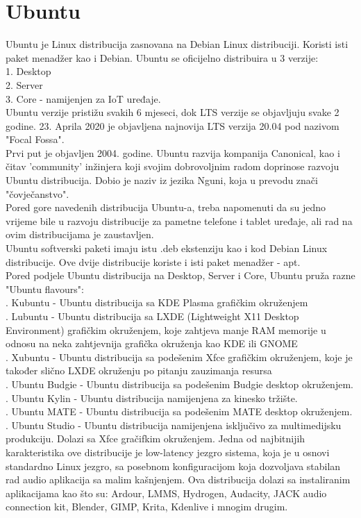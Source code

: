 \documentclass[12pt,vi]{mitthesis}
\begin{document}
\section*{Ubuntu}
Ubuntu je Linux distribucija zasnovana na Debian Linux distribuciji. Koristi isti paket menadžer kao i Debian. Ubuntu se oficijelno distribuira u 3 verzije:\\
1. Desktop\\
2. Server\\
3. Core - namijenjen za IoT uređaje.\\
\indent
Ubuntu verzije pristižu svakih 6 mjeseci, dok LTS verzije se objavljuju svake 2 godine. 23. Aprila 2020 je objavljena najnovija LTS verzija 20.04 pod nazivom "Focal Fossa".\\
\indent
Prvi put je objavljen 2004. godine. Ubuntu razvija kompanija Canonical, kao i čitav 'community' inžinjera koji svojim dobrovoljnim radom doprinose razvoju Ubuntu distribucija. Dobio je naziv iz jezika Nguni, koja u prevodu znači "čovječanstvo".\\
Pored gore navedenih distribucija Ubuntu-a, treba napomenuti da su jedno vrijeme bile u razvoju distribucije za pametne telefone i tablet uređaje, ali rad na ovim distribucijama je zaustavljen.\\
\indent
Ubuntu softverski paketi imaju istu .deb ekstenziju kao i kod Debian Linux distribucije. Ove dvije distribucije koriste i isti paket menadžer - apt.\\
\indent
Pored podjele Ubuntu distribucija na Desktop, Server i Core, Ubuntu pruža razne "Ubuntu flavours":\\
. Kubuntu - Ubuntu distribucija sa KDE Plasma grafičkim okruženjem\\
. Lubuntu - Ubuntu distribucija sa LXDE (Lightweight X11 Desktop Environment) grafičkim okruženjem, koje zahtjeva manje RAM memorije u odnosu na neka zahtjevnija grafička okruženja kao KDE ili GNOME\\
. Xubuntu - Ubuntu distribucija sa podešenim Xfce grafičkim okruženjem, koje je također slično LXDE okruženju po pitanju zauzimanja resursa\\
. Ubuntu Budgie - Ubuntu distribucija sa podešenim Budgie desktop okruženjem.\\
. Ubuntu Kylin - Ubuntu distribucija namijenjena za kinesko tržište.\\
. Ubuntu MATE - Ubuntu distribucija sa podešenim MATE desktop okruženjem.\\
. Ubuntu Studio - Ubuntu distribucija namijenjena isključivo za multimedijsku produkciju. Dolazi sa Xfce gračifkim okruženjem. Jedna od najbitnijih karakteristika ove distribucije je low-latency jezgro sistema, koja je u osnovi standardno Linux jezgro, sa posebnom konfiguracijom koja dozvoljava stabilan rad audio aplikacija sa malim kašnjenjem. Ova distribucija dolazi sa instaliranim aplikacijama kao što su: Ardour, LMMS, Hydrogen, Audacity, JACK audio connection kit, Blender, GIMP, Krita, Kdenlive i mnogim drugim.\\
\end{document}

